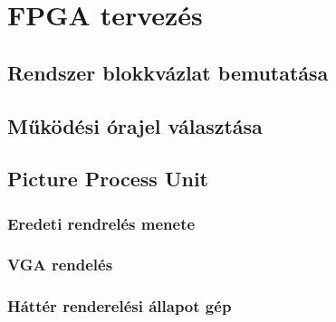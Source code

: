\chapter{FPGA tervezés}

\section{Rendszer blokkvázlat bemutatása}

\section{Működési órajel választása}

\section{Picture Process Unit}
\label{sec:PPU-FPGA}

	\subsection{Eredeti rendrelés menete}

	\subsection{VGA rendelés}

	\subsection{Háttér renderelési állapot gép}
	
